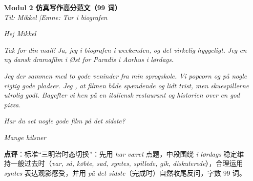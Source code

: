 \begin{answerbox}
\textbf{Modul 2 仿真写作高分范文（99 词）}\\
\textit{Til: Mikkel \quad|\quad Emne: Tur i biografen}

\textit{Hej Mikkel}

\textit{Tak for din mail! Ja, jeg  i biografen i weekenden, og det  virkelig hyggeligt. Jeg  en ny dansk dramafilm i Øst for Paradis i Aarhus i lørdags.}

\textit{Jeg  der sammen med to gode veninder fra min sprogskole. Vi  popcorn og  på nogle rigtig gode pladser. Jeg , at filmen  både spændende og lidt trist, men skuespillerne  utrolig godt. Bagefter  vi hen på en italiensk restaurant og  historien over en god pizza.}

\textit{Har du set nogle gode film på det sidste?}

\textit{Mange hilsner\\
}

\small\textbf{点评}：标准“三明治时态切换”：先用 \textit{har været} 点题，中段围绕 \textit{i lørdags} 稳定维持一般过去时（\textit{var, så, købte, sad, syntes, spillede, gik, diskuterede}），合理运用 \textit{syntes} 表达观影感受，并用 \textit{på det sidste}（完成时）自然收尾反问，字数 99 词。
\end{answerbox}
